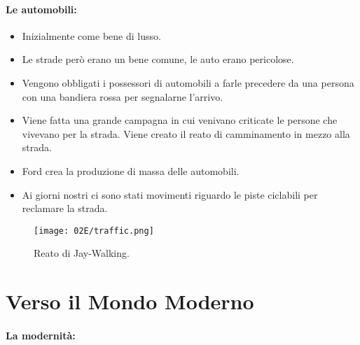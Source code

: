 \paragraph{Le automobili:}

\begin{itemize}
  \item Inizialmente come bene di lusso. 
  \item Le strade però erano un bene comune, le auto erano pericolose. 
  \item Vengono obbligati i possessori di automobili a farle precedere da una persona con una bandiera rossa per segnalarne l'arrivo. 
  \item Viene fatta una grande campagna in cui venivano criticate le persone che vivevano per la strada. Viene creato il reato di camminamento in mezzo alla strada.
  \item Ford crea la produzione di massa delle automobili.
  \item Ai giorni nostri ci sono stati movimenti riguardo le piste ciclabili per reclamare la strada.
\end{itemize}

\begin{figure}[H]
    \centering
    \texttt{[image: 02E/traffic.png]}
    \caption{Reato di Jay-Walking.}
\end{figure}

\section{Verso il Mondo Moderno}

\paragraph{La modernità:}

